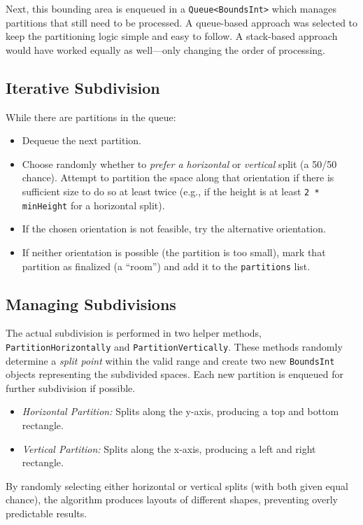 \documentclass[a4paper, 12pt, one column, aas_macros]{article}
\begin{document}
Next, this bounding area is enqueued in a \texttt{Queue<BoundsInt>} which manages partitions that still need to be processed. A queue-based approach was selected to keep the partitioning logic simple and easy to follow. A stack-based approach would have worked equally as well---only changing the order of processing.

\subsection{Iterative Subdivision}
While there are partitions in the queue:
\begin{itemize}
  \item Dequeue the next partition.
  \item Choose randomly whether to \emph{prefer a horizontal} or \emph{vertical} split (a 50/50 chance). Attempt to partition the space along that orientation if there is sufficient size to do so at least twice (e.g., if the height is at least \texttt{2 * minHeight} for a horizontal split).
  \item If the chosen orientation is not feasible, try the alternative orientation.
  \item If neither orientation is possible (the partition is too small), mark that partition as finalized (a ``room'') and add it to the \texttt{partitions} list.
\end{itemize}

\subsection{Managing Subdivisions}
The actual subdivision is performed in two helper methods, \texttt{PartitionHorizontally} and \texttt{PartitionVertically}. These methods randomly determine a \emph{split point} within the valid range and create two new \texttt{BoundsInt} objects representing the subdivided spaces. Each new partition is enqueued for further subdivision if possible.

\begin{itemize}
  \item \emph{Horizontal Partition:} Splits along the y-axis, producing a top and bottom rectangle.
  \item \emph{Vertical Partition:} Splits along the x-axis, producing a left and right rectangle.
\end{itemize}

By randomly selecting either horizontal or vertical splits (with both given equal chance), the algorithm produces layouts of different shapes, preventing overly predictable results.
\end{document}

